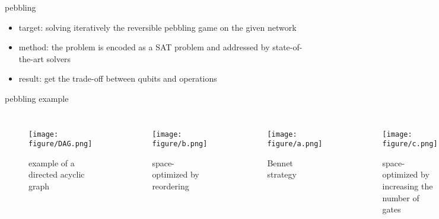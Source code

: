   \begin{frame}{pebbling}
    \begin{itemize}
      \item target: solving iteratively the reversible pebbling game on the given network
      \item method: the problem is encoded as a SAT problem and addressed by state-of-the-art solvers
      \item result: get the trade-off between qubits and operations
    \end{itemize}
  \end{frame}
  \begin{frame}{pebbling example}
    \begin{columns}
        \begin{minipage}[c][0.4\textheight][c]{\linewidth}
          \begin{figure}[h]
            \centering
            \texttt{[image: figure/DAG.png]}
            \caption{example of a directed acyclic graph}
          \end{figure}
        \end{minipage}
        \begin{minipage}[c][0.4\textheight][c]{\linewidth}
          \begin{figure}[h]
            \centering
            \texttt{[image: figure/b.png]}
            \caption{space-optimized by reordering}
          \end{figure}
        \end{minipage}
        
        \begin{minipage}[c][0.4\textheight][c]{\linewidth}
          \begin{figure}[h]  
            \centering
            \texttt{[image: figure/a.png]}
            \caption{Bennet strategy}
          \end{figure}
      \end{minipage}
        \begin{minipage}[c][0.4\textwidth][c]{\linewidth}
          \begin{figure}[h]
              \centering
              \texttt{[image: figure/c.png]}
              \caption{space-optimized by increasing the number of gates}
          \end{figure}
        \end{minipage}
    \end{columns}
  \end{frame}